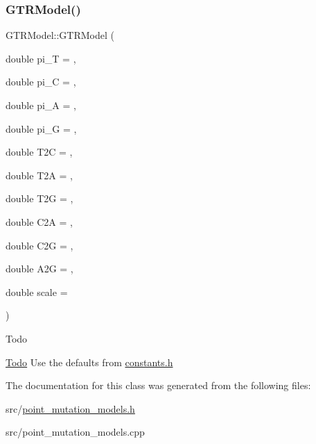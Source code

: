 \subsubsection{\texorpdfstring{G\+T\+R\+Model()}{GTRModel()}}
{\footnotesize\ttfamily G\+T\+R\+Model\+::\+G\+T\+R\+Model (\begin{DoxyParamCaption}\item[{double}]{pi\+\_\+T = {},  }\item[{double}]{pi\+\_\+C = {},  }\item[{double}]{pi\+\_\+A = {},  }\item[{double}]{pi\+\_\+G = {},  }\item[{double}]{T2C = {},  }\item[{double}]{T2A = {},  }\item[{double}]{T2G = {},  }\item[{double}]{C2A = {},  }\item[{double}]{C2G = {},  }\item[{double}]{A2G = {},  }\item[{double}]{scale = {} }\end{DoxyParamCaption})}

\begin{DoxyRefDesc}{Todo}
\item[\mbox{\hyperlink{todo__todo000002}{Todo}}]Use the defaults from \mbox{\hyperlink{constants_8h}{constants.\+h}} \end{DoxyRefDesc}


The documentation for this class was generated from the following files\+:\begin{DoxyCompactItemize}
\item 
src/\mbox{\hyperlink{point__mutation__models_8h}{point\+\_\+mutation\+\_\+models.\+h}}\item 
src/point\+\_\+mutation\+\_\+models.\+cpp\end{DoxyCompactItemize}
